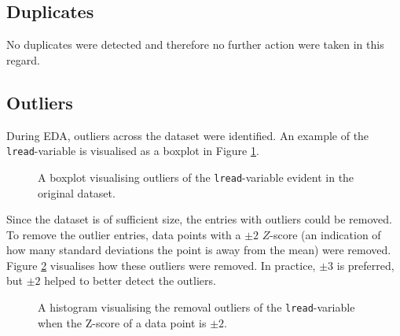 \documentclass{article}
\begin{document}
\subsection{Duplicates}
No duplicates were detected and therefore no further action were taken in this regard.

\subsection{Outliers}
During EDA, outliers across the dataset were identified. An example of the \texttt{lread}-variable is visualised as a boxplot in Figure \ref{boxplot}.

\begin{figure}[H]
  \caption{A boxplot visualising outliers of the \texttt{lread}-variable evident in the original dataset.}
  \label{boxplot}
\end{figure}

Since the dataset is of sufficient size, the entries with outliers could be removed. To remove the outlier entries, data points with a \(\pm{2}\) \(Z\)-score (an indication of how many standard deviations the point is away from the mean) were removed. Figure \ref{outlier} visualises how these outliers were removed. In practice, \(\pm{3}\) is preferred, but \(\pm{2}\) helped to better detect the outliers.

\begin{figure}[H]
  \label{outlier}
  \caption{A histogram visualising the removal outliers of the \texttt{lread}-variable when the Z-score of a data point is \(\pm{2}\).}
\end{figure}
\end{document}
